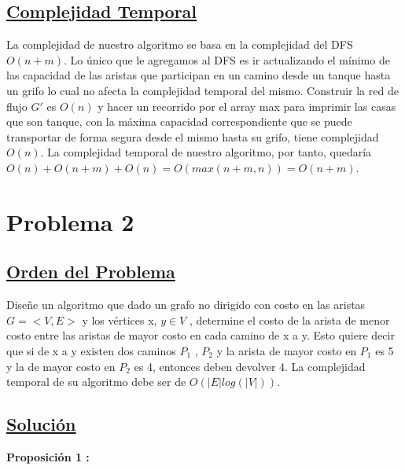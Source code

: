 \documentclass{article}
\begin{document}
    \subsection{\underline{Complejidad Temporal}}
    La complejidad de nuestro algoritmo se basa en la complejidad del DFS $O(n + m)$. Lo \'unico que le agregamos al DFS
    es ir actualizando  el m\'inimo de las capacidad de las aristas que participan en un camino desde un tanque hasta un 
    grifo lo cual no afecta la complejidad temporal del mismo. Construir la red de flujo $G'$ es $O(n)$ y hacer un recorrido por el array max
    para imprimir las casas que son tanque, con la m\'axima capacidad correspondiente que se puede transportar de forma segura 
    desde el mismo hasta su grifo, tiene complejidad $O(n)$. La complejidad temporal de nuestro algoritmo, por tanto, quedar\'ia $O(n) + O(n + m) + O(n) 
    = O(max(n + m, n)) = O(n + m)$.



    \newpage 

    \section{Problema 2} 

    \subsection{\underline{Orden del Problema}}
    
    Dise\~ne un algoritmo que dado un grafo no dirigido con costo en las aristas $G = <V, E>$ y los v\'ertices x, $y \in  V$ ,
    determine el costo de la arista de menor costo entre las aristas de mayor costo en cada camino de x a y. Esto
    quiere decir que si de x a y existen dos caminos $P_1$ , $P_2$ y la arista de mayor costo en $P_1$ es 5 y la de mayor costo
    en $P_2$ es 4, entonces deben devolver 4. La complejidad temporal de su algoritmo debe ser de $O(|E|log(|V|))$.\\

    \subsection{\underline{Soluci\'on}}

    \noindent \textbf{Proposici\'on 1 :} \\
    
\end{document}
